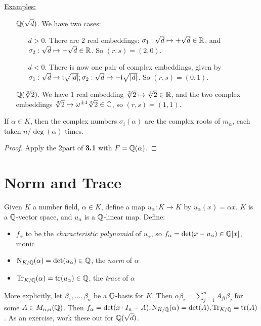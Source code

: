 \documentclass[10pt,a4paper]{article}
\begin{document}
\hspace*{-1em}\underline{Examples:} 
\begin{itemize}
\item[$\mathbb{Q}(\sqrt{d})$.] We have two cases:
\begin{itemize}
\item[$d>0$.] There are $2$ real embeddings: $\sigma_1:\sqrt{d} \mapsto +\sqrt{d} \in \mathbb{R}$, and $\sigma_2:\sqrt{d} \mapsto -\sqrt{d} \in \mathbb{R}$. So $(r,s) = (2, 0)$.
\item[$d<0$.] There is now one pair of complex embeddings, given by $\sigma_1:\sqrt{d} \to \mathfrak{i} \sqrt{|d|}; \sigma_2:\sqrt{d}\to -\mathfrak{i}\sqrt{|d|}$. So $(r,s) = (0,1)$.
\end{itemize}
\item[$\mathbb{Q}(\sqrt[3]{2})$.] We have 1 real embedding $\sqrt[3]{2} \mapsto \sqrt[3]{2} \in \mathbb{R}$, and the two complex embeddings $\sqrt[3]{2} \mapsto \omega^{\pm 1}\sqrt[3]{2} \in \mathbb{C}$, so $(r, s) = (1,1)$.
\end{itemize}

\begin{proposition}
If $\alpha \in K$, then the complex numbers $\sigma_i(\alpha)$ are the complex roots of $m_\alpha$, each taken $n/\deg(\alpha)$ times.
\end{proposition}
\begin{proof}
Apply the 2\th[nd] part of \textbf{3.1} with $F = \mathbb{Q}(\alpha)$.
\end{proof}

\section{Norm and Trace}
Given $K$ a number field, $\alpha \in K$, define a map $u_{\alpha}: K \to K$ by $u_{\alpha}(x) = \alpha x$. $K$ is a $\mathbb{Q}$-vector space, and $u_{\alpha}$ is a $\mathbb{Q}$-linear map.  Define:
\begin{itemize}
\item $f_{\alpha}$ to be the \emph{characteristic polynomial} of $u_{\alpha}$, so $f_{\alpha} = \det(x-u_{\alpha}) \in \mathbb{Q}[x]$, monic
\item $\operatorname{N}_{K/\mathbb{Q}}(\alpha) = \det(u_{\alpha}) \in \mathbb{Q}$, the \emph{norm} of $\alpha$
\item $\operatorname{Tr}_{K/\mathbb{Q}}(\alpha) = \operatorname{tr}(u_{\alpha}) \in \mathbb{Q}$, the \emph{trace} of $\alpha$ 
\end{itemize}
More explicitly, let $\beta_1, \ldots, \beta_n$ be a $\mathbb{Q}$-basis for $K$. Then $\alpha\beta_i = \sum_{j=1}^n A_{ji}\beta_j$ for some $A \in M_{n,n}(\mathbb{Q})$. Then $f_{\alpha} = \det(x\cdot I_n - A), \operatorname{N}_{K/\mathbb{Q}}(\alpha) = \det(A), \operatorname{Tr}_{K/\mathbb{Q}} = \operatorname{tr}(A)$. As an exercise, work these out for $\mathbb{Q}(\sqrt{d})$.
\end{document}
